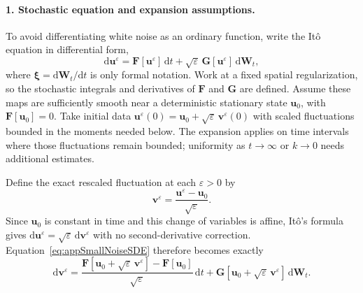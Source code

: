 \documentclass{article}
\begin{document}
\paragraph{1. Stochastic equation and expansion assumptions.}
To avoid differentiating white noise as an ordinary function, write the It\^{o} equation in differential form,
\begin{equation}
    \mathrm d\mathbf u^\varepsilon
    =\mathbf F[\mathbf u^\varepsilon]\,\mathrm dt
    +\sqrt{\varepsilon}\,\mathbf G[\mathbf u^\varepsilon]\,\mathrm d\mathbf W_t,
    \label{eq:appSmallNoiseSDE}
\end{equation}
where $\boldsymbol\xi=\mathrm d\mathbf W_t/\mathrm dt$ is only formal notation. Work at a fixed spatial regularization, so the stochastic integrals and derivatives of $\mathbf F$ and $\mathbf G$ are defined. Assume these maps are sufficiently smooth near a deterministic stationary state $\mathbf u_0$, with $\mathbf F[\mathbf u_0]=0$. Take initial data $\mathbf u^\varepsilon(0)=\mathbf u_0+\sqrt{\varepsilon}\,\mathbf v^\varepsilon(0)$ with scaled fluctuations bounded in the moments needed below. The expansion applies on time intervals where those fluctuations remain bounded; uniformity as $t\to\infty$ or $k\to0$ needs additional estimates.

Define the exact rescaled fluctuation at each $\varepsilon>0$ by
\begin{equation}
    \mathbf v^\varepsilon
    =\frac{\mathbf u^\varepsilon-\mathbf u_0}{\sqrt{\varepsilon}}.
    \label{eq:appScaledFluctuation}
\end{equation}
Since $\mathbf u_0$ is constant in time and this change of variables is affine, It\^{o}'s formula gives $\mathrm d\mathbf u^\varepsilon=\sqrt{\varepsilon}\,\mathrm d\mathbf v^\varepsilon$ with no second-derivative correction. Equation~\eqref{eq:appSmallNoiseSDE} therefore becomes exactly
\begin{equation}
    \mathrm d\mathbf v^\varepsilon
    =\frac{\mathbf F[\mathbf u_0+\sqrt{\varepsilon}\,\mathbf v^\varepsilon]
    -\mathbf F[\mathbf u_0]}{\sqrt{\varepsilon}}\,\mathrm dt
    +\mathbf G[\mathbf u_0+\sqrt{\varepsilon}\,\mathbf v^\varepsilon]\,\mathrm d\mathbf W_t.
    \label{eq:appExactRescaled}
\end{equation}
\end{document}
